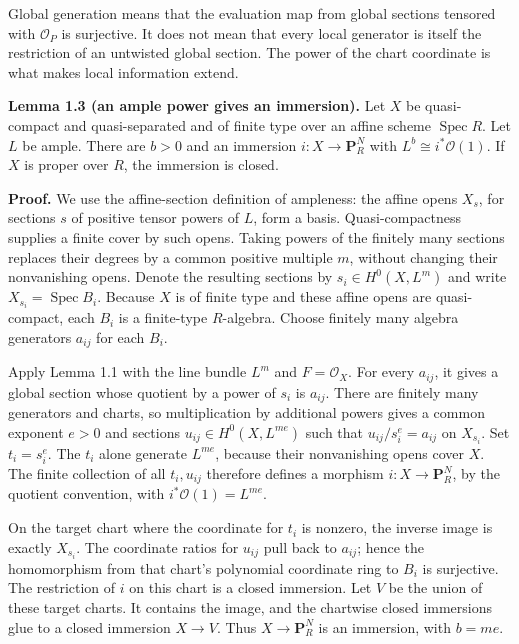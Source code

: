 \documentclass[11pt]{article}
\begin{document}
Global generation means that the evaluation map from global sections
tensored with \(\mathcal O_P\) is surjective. It does not mean that
every local generator is itself the restriction of an untwisted global
section. The power of the chart coordinate is what makes local
information extend.

\textbf{Lemma 1.3 (an ample power gives an immersion).} Let \(X\) be
quasi-compact and quasi-separated and of finite type over an affine
scheme \(\operatorname{Spec}R\). Let \(L\) be ample. There are \(b>0\)
and an immersion \(i:X\to\mathbf P_R^N\) with
\(L^b\cong i^*\mathcal O(1)\). If \(X\) is proper over \(R\), the
immersion is closed.

\textbf{Proof.} We use the affine-section definition of ampleness: the
affine opens \(X_s\), for sections \(s\) of positive tensor powers of
\(L\), form a basis. Quasi-compactness supplies a finite cover by such
opens. Taking powers of the finitely many sections replaces their
degrees by a common positive multiple \(m\), without changing their
nonvanishing opens. Denote the resulting sections by
\(s_i\in H^0(X,L^m)\) and write \(X_{s_i}=\operatorname{Spec}B_i\).
Because \(X\) is of finite type and these affine opens are
quasi-compact, each \(B_i\) is a finite-type \(R\)-algebra. Choose
finitely many algebra generators \(a_{ij}\) for each \(B_i\).

Apply Lemma 1.1 with the line bundle \(L^m\) and \(F=\mathcal O_X\). For
every \(a_{ij}\), it gives a global section whose quotient by a power of
\(s_i\) is \(a_{ij}\). There are finitely many generators and charts, so
multiplication by additional powers gives a common exponent \(e>0\) and
sections \(u_{ij}\in H^0(X,L^{me})\) such that \(u_{ij}/s_i^e=a_{ij}\)
on \(X_{s_i}\). Set \(t_i=s_i^e\). The \(t_i\) alone generate
\(L^{me}\), because their nonvanishing opens cover \(X\). The finite
collection of all \(t_i,u_{ij}\) therefore defines a morphism
\(i:X\to\mathbf P_R^N\), by the quotient convention, with
\(i^*\mathcal O(1)=L^{me}\).

On the target chart where the coordinate for \(t_i\) is nonzero, the
inverse image is exactly \(X_{s_i}\). The coordinate ratios for
\(u_{ij}\) pull back to \(a_{ij}\); hence the homomorphism from that
chart's polynomial coordinate ring to \(B_i\) is surjective. The
restriction of \(i\) on this chart is a closed immersion. Let \(V\) be
the union of these target charts. It contains the image, and the
chartwise closed immersions glue to a closed immersion \(X\to V\). Thus
\(X\to\mathbf P_R^N\) is an immersion, with \(b=me\).
\end{document}
